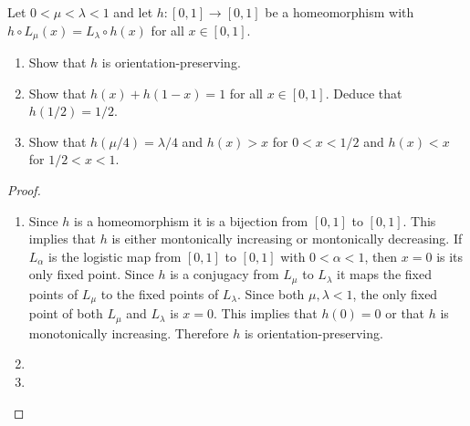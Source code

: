 \begin{problem}{7}
  Let $0 <\mu < \lambda < 1$ and let $h: [0, 1] \to [0, 1]$ be a homeomorphism
  with $h \circ L_\mu(x) = L_\lambda \circ h (x)$ for all $x\in [0, 1]$.
  \begin{enumerate}
    \item Show that $h$ is orientation-preserving.
    \item Show that $h(x) + h(1-x) = 1$ for all $x\in [0, 1]$. Deduce that $h(1/2) = 1/2$.
    \item Show that $h(\mu/4) = \lambda /4$ and $h(x) > x$ for $0 < x < 1/2$ and $h(x) < x$ for
      $1/2 < x < 1$.
  \end{enumerate}
\end{problem}

\begin{proof}
  \begin{enumerate}
    \item Since $h$ is a homeomorphism it is a bijection from $[0,1]$ to $[0,1]$.
      This implies that $h$ is either montonically increasing or montonically decreasing.
      If $L_\alpha$ is the logistic map from $[0,1]$ to $[0,1]$ with $0 < \alpha < 1$, then $x=0$
      is its only fixed point. Since $h$ is a conjugacy from $L_\mu$ to $L_\lambda$ it maps the fixed points
      of $L_\mu$ to the fixed points of $L_\lambda$. Since both $\mu, \lambda < 1$, the only fixed point of both $L_\mu$
      and $L_\lambda$ is $x=0$. This implies that $h(0) = 0$ or that $h$ is monotonically increasing.
      Therefore $h$ is orientation-preserving.

    \item

    \item
  \end{enumerate}
\end{proof}
\newpage
